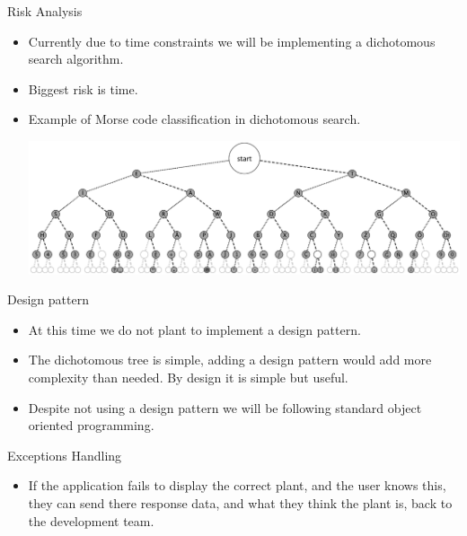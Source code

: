 \documentclass{beamer}
\begin{document}
\begin{frame}{Risk Analysis}
\begin{itemize}
\item Currently due to time constraints we will be implementing a dichotomous search algorithm.
\newline
\item Biggest risk is time.
\newline
\item Example of Morse code classification in dichotomous search.
\begin{center}\includegraphics[scale=.3]{Morse_code_tree3.eps}\end{center}
\end{itemize}
\end{frame}
\begin{frame}{Design pattern}
\begin{itemize}
\item At this time we do not plant to implement a design pattern.
\newline
\item The dichotomous tree is simple, adding a design pattern would add more complexity than needed. By design it is simple but useful.
\newline
\item Despite not using a design pattern we will be following standard object oriented programming.
\end{itemize}
\end{frame}
\begin{frame}{Exceptions Handling}
\begin{itemize}
\item If the application fails to display the correct plant, and the user knows this, they can send there response data, and what they think the plant is, back to the development team.
\end{itemize}
\end{frame}
\end{document}
